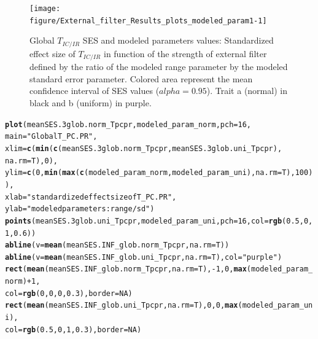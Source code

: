\documentclass[12pt]{article}\usepackage[]{graphicx}\usepackage[]{color}
\makeatletter
\newcommand{\hlnum}[1]{\textcolor[rgb]{0.686,0.059,0.569}{#1}}%
\newcommand{\hlstr}[1]{\textcolor[rgb]{0.192,0.494,0.8}{#1}}%
\newcommand{\hlopt}[1]{\textcolor[rgb]{0,0,0}{#1}}%
\newcommand{\hlstd}[1]{\textcolor[rgb]{0.345,0.345,0.345}{#1}}%
\newcommand{\hlkwc}[1]{\textcolor[rgb]{0.333,0.667,0.333}{#1}}%
\newcommand{\hlkwd}[1]{\textcolor[rgb]{0.737,0.353,0.396}{\textbf{#1}}}%
\newenvironment{kframe}{%
 \def\at@end@of@kframe{}%
 \ifinner\ifhmode%
  \def\at@end@of@kframe{\end{minipage}}%
  \begin{minipage}{\columnwidth}%
 \fi\fi%
 \def\FrameCommand##1{\hskip\@totalleftmargin \hskip-\fboxsep
 \colorbox{shadecolor}{##1}\hskip-\fboxsep
     \hskip-\linewidth \hskip-\@totalleftmargin \hskip\columnwidth}%
 \MakeFramed {\advance\hsize-\width
   \@totalleftmargin\z@ \linewidth\hsize
   \@setminipage}}%
 {\par\unskip\endMakeFramed%
 \at@end@of@kframe}
\newenvironment{knitrout}{}{} %
\makeatother
\begin{document}
\begin{knitrout}
\begin{figure}
{\centering \texttt{[image: figure/External\_filter\_Results\_plots\_modeled\_param1-1]} 

}

\caption[Global $T_{IC/IR}$ SES and modeled parameters values]{Global $T_{IC/IR}$ SES and modeled parameters values: Standardized effect size of $T_{IC/IR}$ in function of the strength of external filter defined by the ratio of the modeled range parameter by the modeled standard error parameter. Colored area represent the mean confidence interval of SES values ($alpha = 0.95$). Trait a (normal) in black and b (uniform) in purple.\label{fig:External_filter_Results_plots_modeled_param1}}
\end{figure}


\end{knitrout}

\begin{knitrout}\small
{}\color{fgcolor}\begin{kframe}
\begin{alltt}
\hlkwd{plot}\hlstd{(meanSES.3glob.norm_Tpcpr, modeled_param_norm,} \hlkwc{pch} \hlstd{=} \hlnum{16}\hlstd{,}
  \hlkwc{main} \hlstd{=} \hlstr{"Global T_PC.PR"}\hlstd{,}
  \hlkwc{xlim} \hlstd{=} \hlkwd{c}\hlstd{(}\hlkwd{min}\hlstd{(}\hlkwd{c}\hlstd{(meanSES.3glob.norm_Tpcpr, meanSES.3glob.uni_Tpcpr),}
    \hlkwc{na.rm} \hlstd{= T),} \hlnum{0}\hlstd{),}
  \hlkwc{ylim} \hlstd{=} \hlkwd{c}\hlstd{(}\hlnum{0}\hlstd{,} \hlkwd{min}\hlstd{(}\hlkwd{max}\hlstd{(}\hlkwd{c}\hlstd{(modeled_param_norm, modeled_param_uni),} \hlkwc{na.rm} \hlstd{= T),} \hlnum{100}\hlstd{)),}
  \hlkwc{xlab} \hlstd{=} \hlstr{"standardized effect size of T_PC.PR"}\hlstd{,}
  \hlkwc{ylab} \hlstd{=} \hlstr{"modeled parameters: range/sd"}\hlstd{)}
\hlkwd{points}\hlstd{(meanSES.3glob.uni_Tpcpr, modeled_param_uni,} \hlkwc{pch} \hlstd{=} \hlnum{16}\hlstd{,} \hlkwc{col} \hlstd{=} \hlkwd{rgb}\hlstd{(}\hlnum{0.5}\hlstd{,} \hlnum{0}\hlstd{,} \hlnum{1}\hlstd{,} \hlnum{0.6}\hlstd{))}
\hlkwd{abline}\hlstd{(}\hlkwc{v} \hlstd{=} \hlkwd{mean}\hlstd{(meanSES.INF_glob.norm_Tpcpr,} \hlkwc{na.rm} \hlstd{= T))}
\hlkwd{abline}\hlstd{(}\hlkwc{v} \hlstd{=} \hlkwd{mean}\hlstd{(meanSES.INF_glob.uni_Tpcpr,} \hlkwc{na.rm} \hlstd{= T),} \hlkwc{col} \hlstd{=} \hlstr{"purple"}\hlstd{)}
\hlkwd{rect}\hlstd{(}\hlkwd{mean}\hlstd{(meanSES.INF_glob.norm_Tpcpr,} \hlkwc{na.rm} \hlstd{= T),} \hlopt{-}\hlnum{1}\hlstd{,} \hlnum{0}\hlstd{,} \hlkwd{max}\hlstd{(modeled_param_norm)} \hlopt{+} \hlnum{1}\hlstd{,}
  \hlkwc{col} \hlstd{=} \hlkwd{rgb}\hlstd{(}\hlnum{0}\hlstd{,} \hlnum{0}\hlstd{,} \hlnum{0}\hlstd{,} \hlnum{0.3}\hlstd{),} \hlkwc{border} \hlstd{=} \hlnum{NA}\hlstd{)}
\hlkwd{rect}\hlstd{(}\hlkwd{mean}\hlstd{(meanSES.INF_glob.uni_Tpcpr,} \hlkwc{na.rm} \hlstd{= T),} \hlnum{0}\hlstd{,} \hlnum{0}\hlstd{,} \hlkwd{max}\hlstd{(modeled_param_uni),}
  \hlkwc{col} \hlstd{=} \hlkwd{rgb}\hlstd{(}\hlnum{0.5}\hlstd{,} \hlnum{0}\hlstd{,} \hlnum{1}\hlstd{,} \hlnum{0.3}\hlstd{),} \hlkwc{border} \hlstd{=} \hlnum{NA}\hlstd{)}
\end{alltt}
\end{kframe}\begin{figure}


\end{figure}
\end{knitrout}
\end{document}
